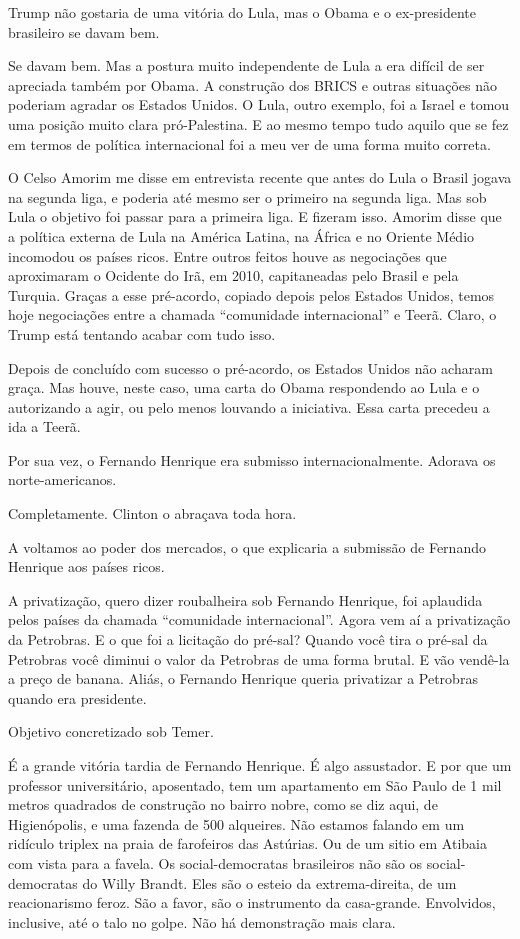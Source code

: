 \falaG Trump não gostaria de uma vitória do Lula, mas o Obama e o
ex-presidente brasileiro se davam bem.

\falaM Se davam bem. Mas a postura muito independente de Lula a era difícil
de ser apreciada também por Obama. A construção dos BRICS e outras
situações não poderiam agradar os Estados Unidos. O Lula, outro exemplo,
foi a Israel e tomou uma posição muito clara pró-Palestina. E ao mesmo
tempo tudo aquilo que se fez em termos de política internacional foi a
meu ver de uma forma muito correta.

\falaG O Celso Amorim me disse em entrevista recente que antes do Lula o
Brasil jogava na segunda liga, e poderia até mesmo ser o primeiro na
segunda liga. Mas sob Lula o objetivo foi passar para a primeira liga. E
fizeram isso. Amorim disse que a política externa de Lula na América
Latina, na África e no Oriente Médio incomodou os países ricos. Entre
outros feitos houve as negociações que aproximaram o Ocidente do Irã, em
2010, capitaneadas pelo Brasil e pela Turquia. Graças a esse pré-acordo,
copiado depois pelos Estados Unidos, temos hoje negociações entre a
chamada ``comunidade internacional'' e Teerã. Claro, o Trump está
tentando acabar com tudo isso.

\falaM Depois de concluído com sucesso o pré-acordo, os Estados Unidos não
acharam graça. Mas houve, neste caso, uma carta do Obama respondendo ao
Lula e o autorizando a agir, ou pelo menos louvando a iniciativa. Essa
carta precedeu a ida a Teerã.

\falaG Por sua vez, o Fernando Henrique era submisso internacionalmente.
Adorava os norte-americanos.

\falaM Completamente. Clinton o abraçava toda hora.

\falaG A voltamos ao poder dos mercados, o que explicaria a submissão de
Fernando Henrique aos países ricos.

\falaM A privatização, quero dizer roubalheira sob Fernando Henrique, foi
aplaudida pelos países da chamada ``comunidade internacional''. Agora
vem aí a privatização da Petrobras. E o que foi a licitação do pré-sal?
Quando você tira o pré-sal da Petrobras você diminui o valor da
Petrobras de uma forma brutal. E vão vendê-la a preço de banana. Aliás,
o Fernando Henrique queria privatizar a Petrobras quando era presidente.

\falaG Objetivo concretizado sob Temer.

\falaM É a grande vitória tardia de Fernando Henrique. É algo assustador. E
por que um professor universitário, aposentado, tem um apartamento em
São Paulo de 1 mil metros quadrados de construção no bairro nobre, como
se diz aqui, de Higienópolis, e uma fazenda de 500 alqueires. Não
estamos falando em um ridículo triplex na praia de farofeiros das
Astúrias. Ou de um sitio em Atibaia com vista para a favela. Os
social-democratas brasileiros não são os social-democratas do Willy
Brandt. Eles são o esteio da extrema-direita, de um reacionarismo feroz.
São a favor, são o instrumento da casa-grande. Envolvidos, inclusive,
até o talo no golpe. Não há demonstração mais clara.

